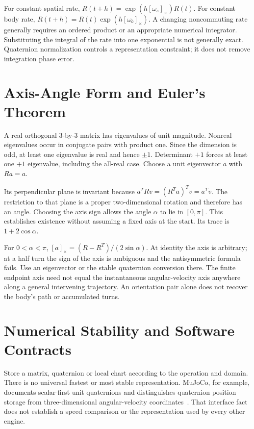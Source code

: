 For constant spatial rate, $R(t+h)=\exp(h[\omega_s]_\times)R(t)$. For constant body rate, $R(t+h)=R(t)\exp(h[\omega_b]_\times)$. A changing noncommuting rate generally requires an ordered product or an appropriate numerical integrator. Substituting the integral of the rate into one exponential is not generally exact. Quaternion normalization controls a representation constraint; it does not remove integration phase error.

\section{Axis-Angle Form and Euler's Theorem}
\label{sec:axis_angle}
\label{thm:euler_rotation_theorem}

A real orthogonal 3-by-3 matrix has eigenvalues of unit magnitude. Nonreal eigenvalues occur in conjugate pairs with product one. Since the dimension is odd, at least one eigenvalue is real and hence $\pm1$. Determinant $+1$ forces at least one $+1$ eigenvalue, including the all-real case. Choose a unit eigenvector $a$ with $Ra=a$.

Its perpendicular plane is invariant because $a^TRv=(R^Ta)^Tv=a^Tv$. The restriction to that plane is a proper two-dimensional rotation and therefore has an angle. Choosing the axis sign allows the angle $\alpha$ to lie in $[0,\pi]$. This establishes existence without assuming a fixed axis at the start. Its trace is $1+2\cos\alpha$.

For $0<\alpha<\pi$, $[a]_\times=(R-R^T)/(2\sin\alpha)$. At identity the axis is arbitrary; at a half turn the sign of the axis is ambiguous and the antisymmetric formula fails. Use an eigenvector or the stable quaternion conversion there. The finite endpoint axis need not equal the instantaneous angular-velocity axis anywhere along a general intervening trajectory. An orientation pair alone does not recover the body's path or accumulated turns.

\section{Numerical Stability and Software Contracts}
\label{sec:rotation_numerics}

Store a matrix, quaternion or local chart according to the operation and domain. There is no universal fastest or most stable representation. MuJoCo, for example, documents scalar-first unit quaternions and distinguishes quaternion position storage from three-dimensional angular-velocity coordinates~\cite{MuJoCoRotationReview}. That interface fact does not establish a speed comparison or the representation used by every other engine.

